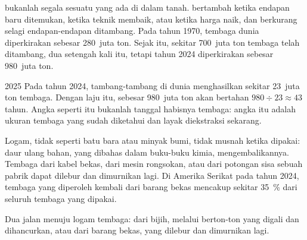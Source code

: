  bukanlah segala sesuatu yang ada di dalam tanah. 
bertambah ketika endapan baru ditemukan, ketika teknik membaik, atau
ketika harga naik, dan berkurang selagi endapan-endapan ditambang. Pada
tahun 1970,  tembaga dunia diperkirakan sebesar 280~juta ton.
Sejak itu, sekitar 700~juta ton tembaga telah ditambang, dua setengah kali
 itu, tetapi  tahun 2024 diperkirakan sebesar 980~juta
ton.

\begin{dated}{2025}
Pada tahun 2024, tambang-tambang di dunia menghasilkan sekitar 23~juta ton
tembaga. Dengan laju itu,  sebesar 980~juta ton akan bertahan
$980 \div 23
\approx 43$ tahun. Angka seperti itu bukanlah tanggal habisnya tembaga:
angka itu adalah ukuran tembaga yang sudah diketahui dan layak diekstraksi
sekarang.
\end{dated}

Logam, tidak seperti batu bara atau minyak bumi, tidak musnah ketika
dipakai: daur ulang bahan, yang dibahas dalam buku-buku kimia,
mengembalikannya. Tembaga dari kabel bekas, dari mesin rongsokan, atau
dari potongan sisa sebuah pabrik dapat dilebur dan dimurnikan lagi. Di
Amerika Serikat pada tahun 2024, tembaga yang diperoleh kembali dari
barang bekas mencakup sekitar \qty{35}{\%} dari seluruh tembaga yang
dipakai.

\begin{omfigure}

{\small Dua jalan menuju logam tembaga: dari bijih, melalui berton-ton
 yang digali dan dihancurkan, atau dari barang bekas, yang dilebur
dan dimurnikan lagi.}
\end{omfigure}

